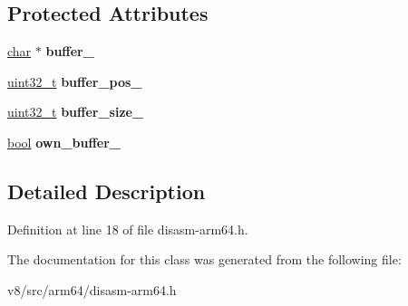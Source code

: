 \subsection*{Protected Attributes}
\begin{DoxyCompactItemize}
\item 
\mbox{\label{classv8_1_1internal_1_1DisassemblingDecoder_a674151a3ce441ae0e7dd86a74dfaea70}} 
\mbox{\hyperlink{classchar}{char}} $\ast$ {\bfseries buffer\+\_\+}
\item 
\mbox{\label{classv8_1_1internal_1_1DisassemblingDecoder_a6498fd77a7c27db7497bd1040b9cc2bf}} 
\mbox{\hyperlink{classuint32__t}{uint32\+\_\+t}} {\bfseries buffer\+\_\+pos\+\_\+}
\item 
\mbox{\label{classv8_1_1internal_1_1DisassemblingDecoder_a64bd8e30232bef0346f867155fc21ac3}} 
\mbox{\hyperlink{classuint32__t}{uint32\+\_\+t}} {\bfseries buffer\+\_\+size\+\_\+}
\item 
\mbox{\label{classv8_1_1internal_1_1DisassemblingDecoder_a819d9421c7e5779d6b2768330e62ea76}} 
\mbox{\hyperlink{classbool}{bool}} {\bfseries own\+\_\+buffer\+\_\+}
\end{DoxyCompactItemize}


\subsection{Detailed Description}


Definition at line 18 of file disasm-\/arm64.\+h.



The documentation for this class was generated from the following file\+:\begin{DoxyCompactItemize}
\item 
v8/src/arm64/disasm-\/arm64.\+h\end{DoxyCompactItemize}
